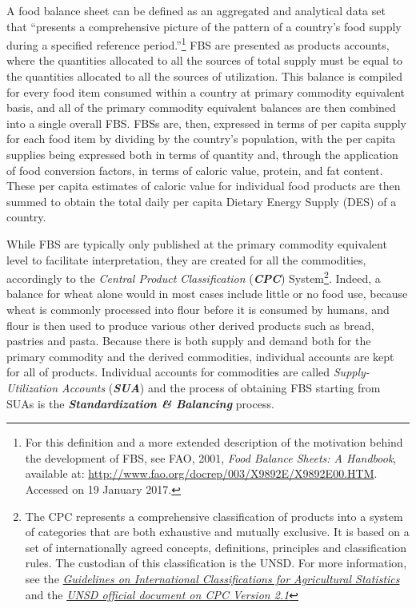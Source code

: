 \documentclass[]{article}
\let\rmarkdownfootnote\footnote%
\def\footnote{\protect\rmarkdownfootnote}
\begin{document}
A food balance sheet can be defined as an aggregated and analytical data
set that ``presents a comprehensive picture of the pattern of a
country's food supply during a specified reference period.''\footnote{For
  this definition and a more extended description of the motivation
  behind the development of FBS, see FAO, 2001, \emph{Food Balance
  Sheets: A Handbook}, available at:
  \url{http://www.fao.org/docrep/003/X9892E/X9892E00.HTM}. Accessed on
  19 January 2017.} FBS are presented as products accounts, where the
quantities allocated to all the sources of total supply must be equal to
the quantities allocated to all the sources of utilization. This balance
is compiled for every food item consumed within a country at primary
commodity equivalent basis, and all of the primary commodity equivalent
balances are then combined into a single overall FBS. FBSs are, then,
expressed in terms of per capita supply for each food item by dividing
by the country's population, with the per capita supplies being
expressed both in terms of quantity and, through the application of food
conversion factors, in terms of caloric value, protein, and fat content.
These per capita estimates of caloric value for individual food products
are then summed to obtain the total daily per capita Dietary Energy
Supply (DES) of a country.

While FBS are typically only published at the primary commodity
equivalent level to facilitate interpretation, they are created for all
the commodities, accordingly to the \emph{Central Product
Classification} (\textbf{\emph{CPC}}) System\footnote{The CPC represents
  a comprehensive classification of products into a system of categories
  that are both exhaustive and mutually exclusive. It is based on a set
  of internationally agreed concepts, definitions, principles and
  classification rules. The custodian of this classification is the
  UNSD. For more information, see the
  \href{http://gsars.org/wp-content/uploads/2015/12/Guidelines-for-Int-Classifications-on-Agricultural-Statistics-web.pdf}{\emph{Guidelines
  on International Classifications for Agricultural Statistics}} and the
  \href{https://unstats.un.org/unsd/cr/downloads/CPCv2.1_complete\%28PDF\%29_English.pdf}{\emph{UNSD
  official document on CPC Version 2.1}}}. Indeed, a balance for wheat
alone would in most cases include little or no food use, because wheat
is commonly processed into flour before it is consumed by humans, and
flour is then used to produce various other derived products such as
bread, pastries and pasta. Because there is both supply and demand both
for the primary commodity and the derived commodities, individual
accounts are kept for all of products. Individual accounts for
commodities are called \emph{Supply-Utilization Accounts}
(\textbf{\emph{SUA}}) and the process of obtaining FBS starting from
SUAs is the \textbf{\emph{Standardization \& Balancing}} process.
\end{document}
